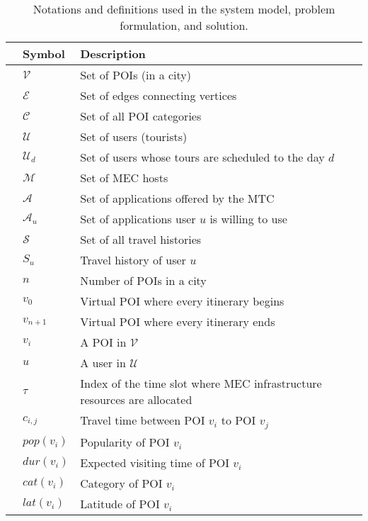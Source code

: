 \begin{table}[htb]
\centering
\footnotesize

{\caption[skip=0pt]{Notations and definitions used in the system model, problem formulation, and solution.}}
\label{tab:notation}
\begin{tabular}{rlp{60mm}}
    \hline
    & \textbf{Symbol} & \textbf{Description}  \\
    \hline
    {\multirow{10}{*}{\rotatebox[origin=r]{90}{Sets}}}
    & $\mathcal{V}$ & Set of POIs (in a city) \\
    & $\mathcal{E}$ & Set of edges connecting vertices\\
    & $\mathcal{C}$ & Set of all POI categories \\
    & $\mathcal{U}$ & Set of users (tourists) \\
    & $\mathcal{U}_d$ & Set of users whose tours are scheduled to the day $d$\\
    & $\mathcal{M}$ & Set of MEC hosts \\
    & $\mathcal{A}$ & Set of applications offered by the MTC \\
    & $\mathcal{A}_{u}$ & Set of applications user $u$ is willing to use \\
    & $\mathcal{S}$ & Set of all travel histories \\
    & $S_u$ & Travel history of user $u$ \\
    \hline
    {\multirow{6}{*}{\rotatebox[origin=r]{90}{Items}}}
    & $n$ & Number of POIs in a city \\
    & $v_0$ & Virtual POI where every itinerary begins \\
    & $v_{n+1}$ & Virtual POI where every itinerary ends \\
    & $v_i$ & A POI in $\mathcal{V}$\\
    & $u$ & A user in $\mathcal{U}$ \\
   & $\tau$ & Index of the time slot where MEC infrastructure resources are allocated \\
    \hline
    {\multirow{8}{*}{\rotatebox[origin=r]{90}{POI/MEC input}}}
    & $c_{i, j}$ & Travel time between POI $v_{i}$ to POI $v_{j}$ \\
    & $pop(v_{i})$ & Popularity of POI $v_i$ \\
    & $dur(v_{i})$ & Expected visiting time of POI $v_i$ \\
    & $cat(v_{i})$ & Category of POI $v_i$ \\
    & $lat(v_{i})$ & Latitude of POI $v_i$ \\

\end{tabular}
\end{table}
